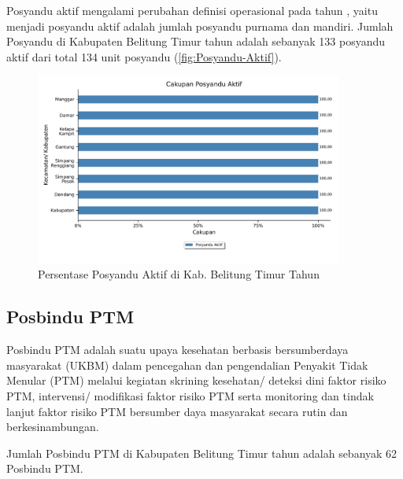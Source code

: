 Posyandu aktif mengalami perubahan definisi operasional pada tahun \tP , yaitu menjadi posyandu aktif adalah jumlah posyandu purnama dan mandiri. Jumlah Posyandu di Kabupaten Belitung Timur tahun \tP adalah sebanyak 133 posyandu aktif dari total 134 unit posyandu (\autoref{fig:Posyandu-Aktif}).

\begin{figure}[H]
	\centering{}
	\includegraphics[width=0.9\textwidth]{bab_02/bab_02_3_posyandu}
	\caption{Persentase Posyandu Aktif di Kab. Belitung Timur Tahun \tP}
	\label{fig:Posyandu-Aktif}
\end{figure}

\subsection{Posbindu PTM}
Posbindu PTM adalah suatu upaya kesehatan berbasis bersumberdaya masyarakat (UKBM) dalam pencegahan dan pengendalian Penyakit Tidak Menular (PTM) melalui kegiatan skrining kesehatan/ deteksi dini faktor risiko PTM, intervensi/ modifikasi faktor risiko PTM serta monitoring dan tindak lanjut faktor risiko PTM bersumber daya masyarakat secara rutin dan berkesinambungan.

Jumlah Posbindu PTM di Kabupaten Belitung Timur tahun \tP adalah sebanyak 62 Posbindu PTM. %
